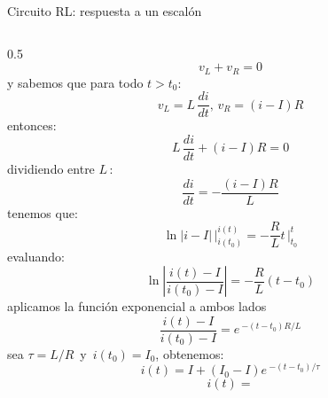 \documentclass[aspectratio=169]{beamer}
\begin{document}
\begin{frame}{Circuito RL: respuesta a un escalón}
\begin{columns}[onlytextwidth]
\begin{column}{0.5\textwidth}
{{            \begin{equation*}
                v_L + v_R = 0
            \end{equation*}
            }
            {y sabemos que para todo $t>t_0$: 
            \begin{equation*}
                v_L = L\,\dfrac{di}{dt},\, v_R=(i-I)R
            \end{equation*}
            }
            {entonces:
            \begin{equation*}
                L\,\dfrac{di}{dt} + (i-I)R = 0
            \end{equation*}
            }
        }
            {
            {dividiendo entre $L\,$:
            \begin{equation*}
                \dfrac{di}{dt} = -\dfrac{(i-I)R}{L}
            \end{equation*}
            }
        }
            {
            {tenemos que:
            \begin{equation*}
                \ln|i-I|\,\bigg|_{i(t_0)}^{i(t)} = -\frac{R}{L}t\,\bigg|_{t_0}^{t}
            \end{equation*}
            }
            {evaluando:
            \begin{equation*}
                \ln\left|\dfrac{i(t)-I}{i(t_0)-I}\right| = -\frac{R}{L}(t - t_0)
            \end{equation*}
            }
        }
            {
            {aplicamos la función exponencial a ambos lados
            \begin{equation*}
                \dfrac{i(t)-I}{i(t_0)-I} = e\,^{-(t - t_0)R/L}
            \end{equation*}
            }
            {sea $\tau=L/R\,$ y $\,i(t_0) = I_0$, obtenemos:
            \begin{equation*}
                i(t)=I + (I_0-I)e\,^{-(t - t_0)/ \tau}
            \end{equation*}
            }
        }
            {
            {\begin{equation*}
                i(t) =

\end{equation*}}}
\end{column}
\end{columns}
\end{frame}
\end{document}
